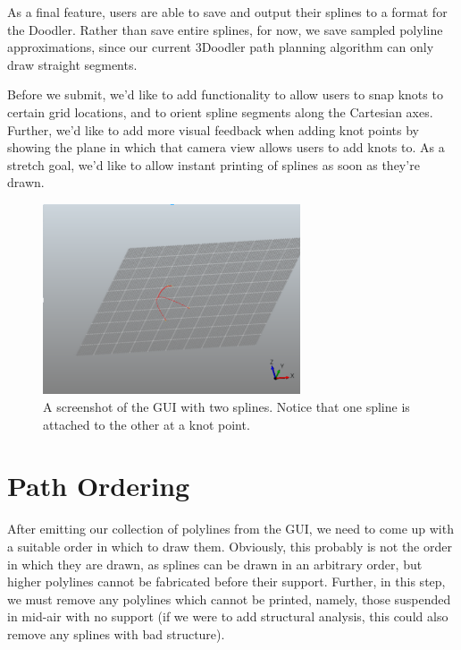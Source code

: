 \documentclass[conference]{acmsiggraph}
\begin{document}
As a final feature, users are able to save and output their splines to a format for the Doodler.  Rather than save entire splines, for now, we save sampled polyline approximations, since our current 3Doodler path planning algorithm can only draw straight segments.

Before we submit, we'd like to add functionality to allow users to snap knots to certain grid locations, and to orient spline segments along the Cartesian axes.  Further, we'd like to add more visual feedback when adding knot points by showing the plane in which that camera view allows users to add knots to.  As a stretch goal, we'd like to allow instant printing of splines as soon as they're drawn.

\begin{figure}[ht]
  \centering
  \includegraphics[width=3.0in]{images/GUI.png}
  \caption{A screenshot of the GUI with two splines.  Notice that one spline is attached to the other at a knot point.}
  \label{fig:GUI}
\end{figure}

\section{Path Ordering}
After emitting our collection of polylines from the GUI, we need to come up with a suitable order in which to draw them.  Obviously, this probably is not the order in which they are drawn, as splines can be drawn in an arbitrary order, but higher polylines cannot be fabricated before their support.  Further, in this step, we must remove any polylines which cannot be printed, namely, those suspended in mid-air with no support (if we were to add structural analysis, this could also remove any splines with bad structure).
\end{document}
